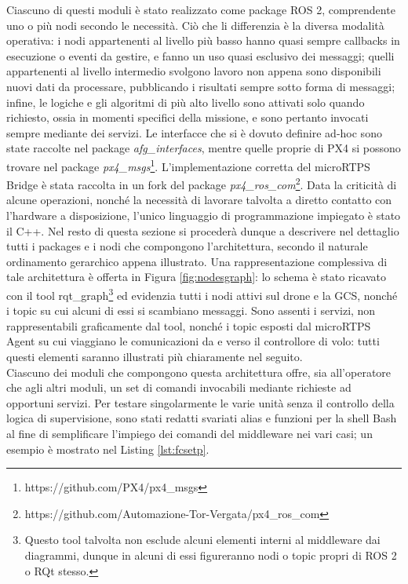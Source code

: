 Ciascuno di questi moduli è stato realizzato come package ROS 2, comprendente uno o più nodi secondo le necessità. Ciò che li differenzia è la diversa modalità operativa: i nodi appartenenti al livello più basso hanno quasi sempre callbacks in esecuzione o eventi da gestire, e fanno un uso quasi esclusivo dei messaggi; quelli appartenenti al livello intermedio svolgono lavoro non appena sono disponibili nuovi dati da processare, pubblicando i risultati sempre sotto forma di messaggi; infine, le logiche e gli algoritmi di più alto livello sono attivati solo quando richiesto, ossia in momenti specifici della missione, e sono pertanto invocati sempre mediante dei servizi. Le interfacce che si è dovuto definire ad-hoc sono state raccolte nel package \emph{afg\_interfaces}, mentre quelle proprie di PX4 si possono trovare nel package \emph{px4\_msgs}\footnote{https://github.com/PX4/px4\_msgs}. L'implementazione corretta del microRTPS Bridge è stata raccolta in un fork del package \emph{px4\_ros\_com}\footnote{https://github.com/Automazione-Tor-Vergata/px4\_ros\_com}. Data la criticità di alcune operazioni, nonché la necessità di lavorare talvolta a diretto contatto con l'hardware a disposizione, l'unico linguaggio di programmazione impiegato è stato il C++. Nel resto di questa sezione si procederà dunque a descrivere nel dettaglio tutti i packages e i nodi che compongono l'architettura, secondo il naturale ordinamento gerarchico appena illustrato. Una rappresentazione complessiva di tale architettura è offerta in Figura \ref{fig:nodesgraph}: lo schema è stato ricavato con il tool rqt\_graph\footnote{Questo tool talvolta non esclude alcuni elementi interni al middleware dai diagrammi, dunque in alcuni di essi figureranno nodi o topic propri di ROS 2 o RQt stesso.} ed evidenzia tutti i nodi attivi sul drone e la GCS, nonché i topic su cui alcuni di essi si scambiano messaggi. Sono assenti i servizi, non rappresentabili graficamente dal tool, nonché i topic esposti dal microRTPS Agent su cui viaggiano le comunicazioni da e verso il controllore di volo: tutti questi elementi saranno illustrati più chiaramente nel seguito.\\
Ciascuno dei moduli che compongono questa architettura offre, sia all'operatore che agli altri moduli, un set di comandi invocabili mediante richieste ad opportuni servizi. Per testare singolarmente le varie unità senza il controllo della logica di supervisione, sono stati redatti svariati alias e funzioni per la shell Bash al fine di semplificare l'impiego dei comandi del middleware nei vari casi; un esempio è mostrato nel Listing \ref{lst:fcsetp}.

